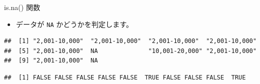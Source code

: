 \documentclass[
  ignorenonframetext,
]{beamer}
\newenvironment{Shaded}{\begin{snugshade}}{\end{snugshade}}
\newcommand{\AttributeTok}[1]{\textcolor[rgb]{0.77,0.63,0.00}{#1}}
\newcommand{\CommentTok}[1]{\textcolor[rgb]{0.56,0.35,0.01}{\textit{#1}}}
\newcommand{\DecValTok}[1]{\textcolor[rgb]{0.00,0.00,0.81}{#1}}
\newcommand{\FunctionTok}[1]{\textcolor[rgb]{0.00,0.00,0.00}{#1}}
\newcommand{\NormalTok}[1]{#1}
\newcommand{\OtherTok}[1]{\textcolor[rgb]{0.56,0.35,0.01}{#1}}
\newcommand{\SpecialCharTok}[1]{\textcolor[rgb]{0.00,0.00,0.00}{#1}}
\newcommand{\StringTok}[1]{\textcolor[rgb]{0.31,0.60,0.02}{#1}}
\providecommand{\tightlist}{%
  \setlength{\itemsep}{0pt}\setlength{\parskip}{0pt}}
\begin{document}
\begin{frame}[fragile]{is.na() 関数}
\protect\hypertarget{is.na-ux95a2ux6570}{}
\begin{itemize}
\tightlist
\item
  データが \texttt{NA} かどうかを判定します。
\end{itemize}

\scriptsize

\begin{Shaded}
\end{Shaded}

\begin{verbatim}
##  [1] "2,001-10,000"  "2,001-10,000"  "2,001-10,000"  "2,001-10,000" 
##  [5] "2,001-10,000"  NA              "10,001-20,000" "2,001-10,000" 
##  [9] "2,001-10,000"  NA
\end{verbatim}

\begin{Shaded}
\end{Shaded}

\begin{verbatim}
##  [1] FALSE FALSE FALSE FALSE FALSE  TRUE FALSE FALSE FALSE  TRUE
\end{verbatim}

\normalsize
\end{frame}
\end{document}
